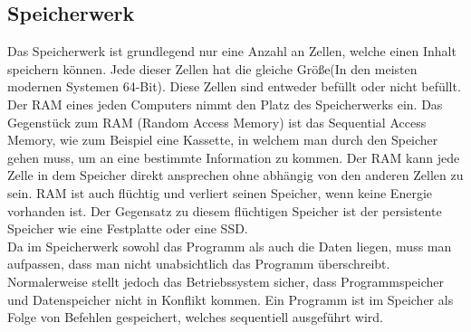 \documentclass{article}
\begin{document}
		\subsection{Speicherwerk}
		Das Speicherwerk ist grundlegend nur eine Anzahl an Zellen, welche einen Inhalt speichern können. Jede dieser Zellen hat die gleiche Größe(In den meisten modernen Systemen 64-Bit). Diese Zellen sind entweder befüllt oder nicht befüllt. Der RAM eines jeden Computers nimmt den Platz des Speicherwerks ein. Das Gegenstück zum RAM (Random Access Memory) ist das Sequential Access Memory, wie zum Beispiel eine Kassette, in welchem man durch den Speicher gehen muss, um an eine bestimmte Information zu kommen. Der RAM kann jede Zelle in dem Speicher direkt ansprechen ohne abhängig von den anderen Zellen zu sein. RAM ist auch flüchtig und verliert seinen Speicher, wenn keine Energie vorhanden ist. Der Gegensatz zu diesem flüchtigen Speicher ist der persistente Speicher wie eine Festplatte oder eine SSD. \\
		Da im Speicherwerk sowohl das Programm als auch die Daten liegen, muss man aufpassen, dass man nicht unabsichtlich das Programm überschreibt. Normalerweise stellt jedoch das Betriebssystem sicher, dass Programmspeicher und Datenspeicher nicht in Konflikt kommen. Ein Programm ist im Speicher als Folge von Befehlen gespeichert, welches sequentiell ausgeführt wird.
\end{document}

